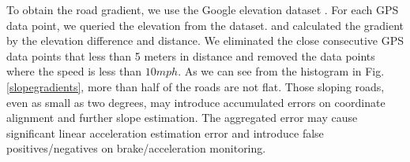 To obtain the road gradient, we use the Google elevation dataset \cite{googleelevation}. 
For each GPS data point, we queried the elevation from the dataset. 
and calculated the gradient by the elevation difference
and distance.
We eliminated the close consecutive GPS data points that less than 5 meters in distance and removed the data points where the speed is less than $10mph$.
As we can see from the histogram in Fig. \ref{slopegradients}, 
more than half of the roads are not flat.
Those sloping roads, even as small as two degrees, may introduce accumulated
errors on coordinate alignment and further slope estimation.
The aggregated error may cause significant linear acceleration estimation error
and introduce false positives/negatives on brake/acceleration monitoring. 

